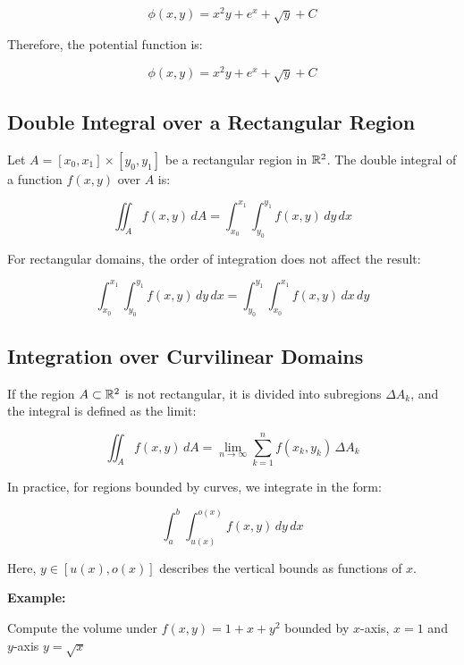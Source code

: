 \[
    \phi(x, y) = x^2y + e^x + \sqrt{y} + C
\]

Therefore, the potential function is:

\[
    \phi(x, y) = x^2y + e^x + \sqrt{y} + C
\]

\subsection{Double Integral over a Rectangular Region}

Let \( A = [x_0, x_1] \times [y_0, y_1] \) be a rectangular region in \( \mathbb{R}^2 \). The double 
integral of a function \( f(x, y) \) over \(A\) is:

\[
    \iint_A f(x, y)\, dA = \int_{x_0}^{x_1} \int_{y_0}^{y_1} f(x, y)\, dy\, dx
\]

For rectangular domains, the order of integration does not affect the result:

\[
    \int_{x_0}^{x_1} \int_{y_0}^{y_1} f(x, y)\, dy\, dx = \int_{y_0}^{y_1} \int_{x_0}^{x_1} 
    f(x, y)\, dx\, dy
\]

\subsection{Integration over Curvilinear Domains}

If the region \( A \subset \mathbb{R}^2 \) is not rectangular, it is divided into subregions 
\( \Delta A_k \), and the integral is defined as the limit:

\[
    \iint_A f(x, y)\, dA = \lim_{n \to \infty} \sum_{k=1}^n f(x_k, y_k) \, \Delta A_k
\]

In practice, for regions bounded by curves, we integrate in the form:

\[
    \int_a^b \int_{u(x)}^{o(x)} f(x, y)\, dy\, dx
\]

Here, \( y \in [u(x), o(x)] \) describes the vertical bounds as functions of \(x\).

\textbf{Example:}

Compute the volume under \(f(x,y) = 1 + x + y^2\) bounded by \(x\)-axis, \(x = 1\) and \(y\)-axis 
\(y = \sqrt{x}\)

\begin{center}
\end{center}

